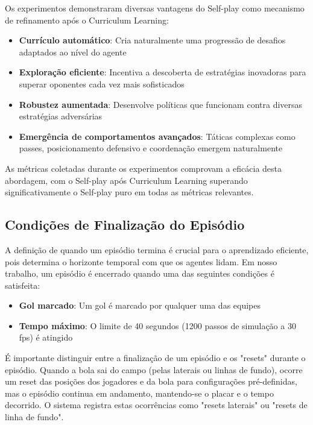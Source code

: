 Os experimentos demonstraram diversas vantagens do Self-play como mecanismo de refinamento após o Curriculum Learning:

\begin{itemize}
    \item \textbf{Currículo automático}: Cria naturalmente uma progressão de desafios adaptados ao nível do agente
    \item \textbf{Exploração eficiente}: Incentiva a descoberta de estratégias inovadoras para superar oponentes cada vez mais sofisticados
    \item \textbf{Robustez aumentada}: Desenvolve políticas que funcionam contra diversas estratégias adversárias
    \item \textbf{Emergência de comportamentos avançados}: Táticas complexas como passes, posicionamento defensivo e coordenação emergem naturalmente
\end{itemize}

As métricas coletadas durante os experimentos comprovam a eficácia desta abordagem, com o Self-play após Curriculum Learning superando significativamente o Self-play puro em todas as métricas relevantes.

\subsection{Condições de Finalização do Episódio}

A definição de quando um episódio termina é crucial para o aprendizado eficiente, pois determina o horizonte temporal com que os agentes lidam. Em nosso trabalho, um episódio é encerrado quando uma das seguintes condições é satisfeita:

\begin{itemize}
    \item \textbf{Gol marcado}: Um gol é marcado por qualquer uma das equipes
    \item \textbf{Tempo máximo}: O limite de 40 segundos (1200 passos de simulação a 30 fps) é atingido
\end{itemize}

É importante distinguir entre a finalização de um episódio e os "resets" durante o episódio. Quando a bola sai do campo (pelas laterais ou linhas de fundo), ocorre um reset das posições dos jogadores e da bola para configurações pré-definidas, mas o episódio continua em andamento, mantendo-se o placar e o tempo decorrido. O sistema registra estas ocorrências como "resets laterais" ou "resets de linha de fundo".

